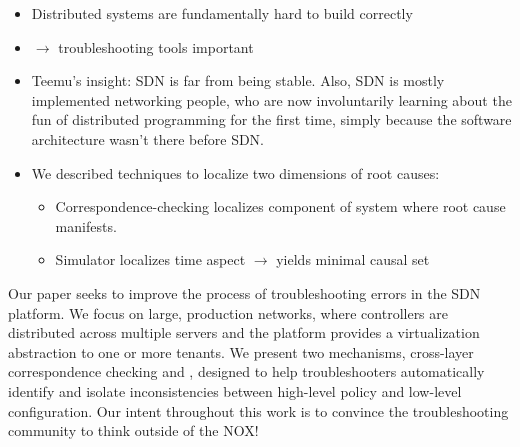 \begin{itemize}
\item Distributed systems are fundamentally hard to build correctly 
\item $\rightarrow$ troubleshooting tools important
\item Teemu’s insight: SDN is far from being stable. Also, SDN is mostly implemented
networking people, who are now involuntarily learning about the fun of
distributed programming for the first time, simply because the software
architecture wasn't there before SDN.
\item We described techniques to localize two dimensions of root causes:
    \begin{itemize}
    \item Correspondence-checking localizes component of system where root cause
    manifests. 
    \item Simulator localizes time aspect $\rightarrow$ yields minimal causal set
    \end{itemize}
\end{itemize}

Our paper seeks to improve the process of troubleshooting errors in the SDN
platform. We focus on large, production networks, 
where controllers are distributed across multiple servers
and the platform provides a virtualization abstraction to one or more tenants.
We present two mechanisms, cross-layer correspondence checking
and \simulator{}, designed to help troubleshooters automatically identify
and isolate inconsistencies between high-level policy and low-level
configuration. Our intent throughout this work is to convince
the troubleshooting community to think outside of the NOX!
